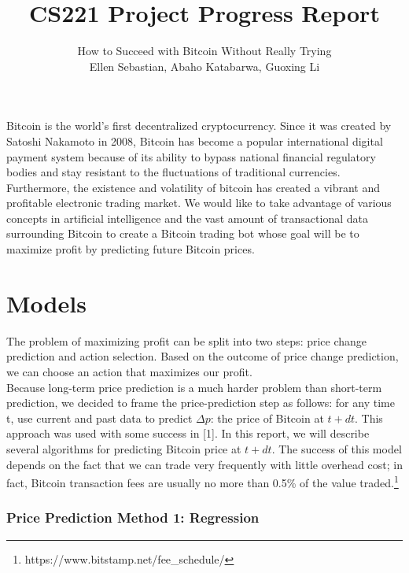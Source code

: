 \documentclass[10pt]{article}
\title{ CS221 Project Progress Report}
\author{How to Succeed with Bitcoin Without Really Trying \\Ellen Sebastian, Abaho Katabarwa, Guoxing Li  }
\begin{document}
\maketitle

 						
 Bitcoin is the world's first decentralized cryptocurrency. Since it was created by Satoshi Nakamoto in 2008, Bitcoin has become a popular international digital payment system because of its ability to bypass national financial regulatory bodies and stay resistant to the fluctuations of traditional currencies. Furthermore, the existence and volatility of bitcoin has created a vibrant and profitable electronic trading market. We would like to take advantage of various concepts in artificial intelligence and the vast amount of transactional data surrounding Bitcoin to create a Bitcoin trading bot whose goal will be to maximize profit by predicting future Bitcoin prices.
 
\section*{Models} 					
 
 
 The problem of maximizing profit can be split into two steps: price change prediction and action selection. Based on the outcome of price change prediction, we can choose an action that maximizes our profit. \\
 Because long-term price prediction is a much harder problem than short-term prediction, we decided to frame the price-prediction step as follows: for any 
 time t, use current and past data to predict $\Delta p$: the price of Bitcoin at $t+dt$. This approach was used with some success in [1]. In this report, we will describe several algorithms for predicting Bitcoin price at $t + dt$.  The success of this model depends on the fact that we can trade very frequently with little overhead cost; in fact, Bitcoin transaction fees are usually no more than 0.5\% of the value traded.\footnote{https://www.bitstamp.net/fee\_schedule/}
 
  \subsubsection*{Price Prediction Method 1: Regression} 					
				
\end{document}
